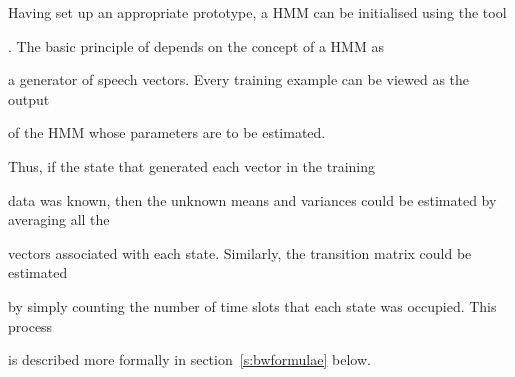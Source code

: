 




Having set up an appropriate prototype, a HMM can be initialised using the \HTK tool


.   The basic principle of  depends on the concept of a HMM as


a generator of speech vectors.  Every training example can be viewed as the output


of the HMM whose parameters are to be estimated.  


Thus, if the state that generated each vector in the training


data was known, then the unknown means and variances could be estimated by averaging all the


vectors associated with each state.  Similarly, the transition matrix could be estimated


by simply counting the number of time slots that each state was occupied.  This process


is described more formally in section~\ref{s:bwformulae} below.





